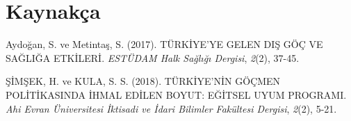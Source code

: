 \documentclass[
  12pt,
]{article}
\newlength{\cslhangindent}
\newlength{\cslentryspacingunit} %
\newenvironment{CSLReferences}[2] %
 {%
  \setlength{\parindent}{0pt}
  \ifodd #1
  \let\oldpar\par
  \def\par{\hangindent=\cslhangindent\oldpar}
  \fi
  \setlength{\parskip}{#2\cslentryspacingunit}
 }%
 {}
\begin{document}
\newpage

\hypertarget{references}{%
\section{Kaynakça}\label{references}}

\hypertarget{refs}{}
\begin{CSLReferences}{1}{0}
\leavevmode{}%
Aydoğan, S. ve Metintaş, S. (2017). T{Ü}RK{İ}YE'YE GELEN DI{Ş} G{Ö}{Ç} VE SA{Ğ}LI{Ğ}A ETK{İ}LER{İ}. \emph{EST{Ü}DAM Halk Sa{ğ}l{ı}{ğ}{ı} Dergisi}, \emph{2}(2), 37-45.

\leavevmode{}%
ŞİMŞEK, H. ve KULA, S. S. (2018). T{Ü}RK{İ}YE'N{İ}N G{Ö}{Ç}MEN POL{İ}T{İ}KASINDA {İ}HMAL ED{İ}LEN BOYUT: E{Ğ}{İ}TSEL UYUM PROGRAMI. \emph{Ahi Evran {Ü}niversitesi {İ}ktisadi ve {İ}dari Bilimler Fak{ü}ltesi Dergisi}, \emph{2}(2), 5-21.

\end{CSLReferences}
\end{document}
